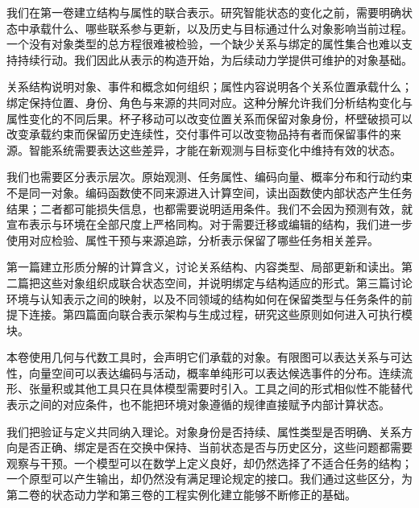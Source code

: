 我们在第一卷建立结构与属性的联合表示。研究智能状态的变化之前，需要明确状态中承载什么、哪些联系参与更新，以及历史与目标通过什么对象影响当前过程。一个没有对象类型的总方程很难被检验，一个缺少关系与绑定的属性集合也难以支持持续行动。我们因此从表示的构造开始，为后续动力学提供可维护的对象基础。

关系结构说明对象、事件和概念如何组织；属性内容说明各个关系位置承载什么；绑定保持位置、身份、角色与来源的共同对应。这种分解允许我们分析结构变化与属性变化的不同后果。杯子移动可以改变位置关系而保留对象身份，杯壁破损可以改变承载约束而保留历史连续性，交付事件可以改变物品持有者而保留事件的来源。智能系统需要表达这些差异，才能在新观测与目标变化中维持有效的状态。

我们也需要区分表示层次。原始观测、任务属性、编码向量、概率分布和行动约束不是同一对象。编码函数使不同来源进入计算空间，读出函数使内部状态产生任务结果；二者都可能损失信息，也都需要说明适用条件。我们不会因为预测有效，就宣布表示与环境在全部尺度上严格同构。对于需要迁移或编辑的结构，我们进一步使用对应检验、属性干预与来源追踪，分析表示保留了哪些任务相关差异。

第一篇建立形质分解的计算含义，讨论关系结构、内容类型、局部更新和读出。第二篇把这些对象组织成联合状态空间，并说明绑定与结构适应的形式。第三篇讨论环境与认知表示之间的映射，以及不同领域的结构如何在保留类型与任务条件的前提下连接。第四篇面向联合表示架构与生成过程，研究这些原则如何进入可执行模块。

本卷使用几何与代数工具时，会声明它们承载的对象。有限图可以表达关系与可达性，向量空间可以表达编码与活动，概率单纯形可以表达候选事件的分布。连续流形、张量积或其他工具只在具体模型需要时引入。工具之间的形式相似性不能替代表示之间的对应条件，也不能把环境对象遵循的规律直接赋予内部计算状态。

我们把验证与定义共同纳入理论。对象身份是否持续、属性类型是否明确、关系方向是否正确、绑定是否在交换中保持、当前状态是否与历史区分，这些问题都需要观察与干预。一个模型可以在数学上定义良好，却仍然选择了不适合任务的结构；一个原型可以产生输出，却仍然没有满足理论规定的接口。我们通过这些区分，为第二卷的状态动力学和第三卷的工程实例化建立能够不断修正的基础。
